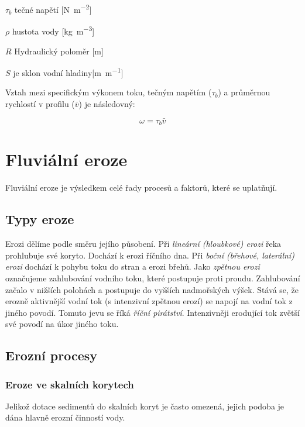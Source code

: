 \begin{eqexpl}
	\item{$\tau_{b}$} tečné napětí [\si{\newton\per\metre\squared}]
	\item{$\rho$} hustota vody [\si{\kilogram\per\metre\cubed}]
	\item{$R$} Hydraulický poloměr [\si{\metre}]
	\item{$S$} je sklon vodní hladiny[\si{\metre\per\metre}]
\end{eqexpl}

Vztah mezi specifickým výkonem toku, tečným napětím ($\tau_{b}$) a průměrnou rychlostí v profilu ($\bar{v}$) je následovný:

\begin{equation}\label{eq:spec_vykon_tecne}
	\omega = \tau_{b} \bar{v}
\end{equation}

\section{Fluviální eroze}
Fluviální eroze je výsledkem celé řady procesů a faktorů, které se uplatňují. 

\subsection{Typy eroze}
Erozi dělíme podle směru jejího působení. Při \emph{lineární (hloubkové) erozi} řeka prohlubuje své koryto. Dochází k erozi říčního dna. Při \emph{boční (břehové, laterální) erozi} dochází k pohybu toku do stran a erozi břehů. Jako \emph{zpětnou erozi} označujeme zahlubování vodního toku, které postupuje proti proudu. Zahlubování začalo v nižších polohách a postupuje do vyšších nadmořských výšek. Stává se, že erozně aktivnější vodní tok (s intenzivní zpětnou erozí) se napojí na vodní tok z jiného povodí. Tomuto jevu se říká \emph{říční pirátství}. Intenzivněji erodující tok zvětší své povodí na úkor jiného toku. 


\subsection{Erozní procesy}

\subsubsection{Eroze ve skalních korytech}
Jelikož dotace sedimentů do skalních koryt je často omezená, jejich podoba je dána hlavně erozní činností vody. 

